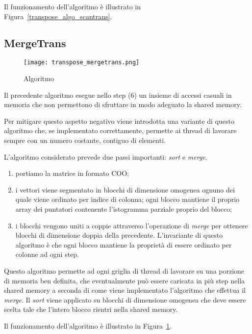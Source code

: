 Il funzionamento dell'algoritmo è illustrato in Figura~\ref{transpose_algo_scantrans}. 

\subsection{MergeTrans}

\begin{figure}[htbp]
    \centering
	\texttt{[image: transpose\_mergetrans.png]}
	\caption{Algoritmo \MergeTrans}
	\label{transpose_algo_mergerans}
\end{figure}
	
Il precedente algoritmo esegue nello step (6) un insieme di accessi casuali in memoria che non permettono di sfruttare in modo adeguato la shared memory. 

Per mitigare questo aspetto negativo viene introdotta una variante di questo algoritmo che, se implementato correttamente, permette ai thread di lavorare sempre con un numero costante, contiguo di elementi. 
	
L'algoritmo considerato prevede due passi importanti: \textit{sort} e \textit{merge}.
\begin{enumerate}
    \item portiamo la matrice in formato COO;
    \item i vettori viene segmentato in blocchi di dimensione omogenea ognuno dei quale viene ordinato per indice di colonna; ogni blocco mantiene il proprio array dei puntatori contenente l'istogramma parziale proprio del blocco;
    \item i blocchi vengono uniti a coppie attraverso l'operazione di \emph{merge} per ottenere blocchi di dimensione doppia della precedente. L'invariante di questo algoritmo è che ogni blocco mantiene la proprietà di essere ordinato per colonne ad ogni step.
\end{enumerate}

Questo algoritmo permette ad ogni griglia di thread di lavorare su una porzione di memoria ben definita, che eventualmente può essere caricata in più step nella shared memory a seconda di come viene implementato l'algoritmo che effettua il \emph{merge}. Il \emph{sort} viene applicato su blocchi di dimensione omogenea che deve essere scelta tale che l'intero blocco rientri nella shared memory.

Il funzionamento dell'algoritmo è illustrato in Figura~\ref{transpose_algo_mergerans}. 



